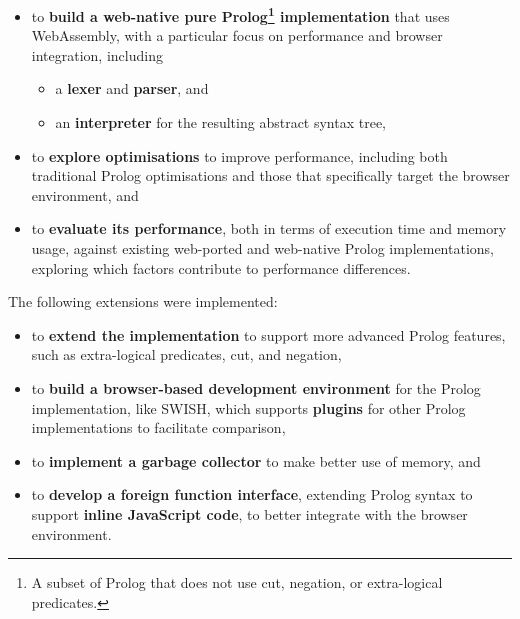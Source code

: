 \begin{itemize}
\item to \textbf{build a web-native pure Prolog\footnote{A subset of Prolog that does not use cut, negation, or extra-logical predicates.} implementation} that uses WebAssembly, with a particular focus on performance and browser integration, including
\begin{itemize}
\item a \textbf{lexer} and \textbf{parser}, and
\item an \textbf{interpreter} for the resulting abstract syntax tree,
\end{itemize}
\item to \textbf{explore optimisations} to improve performance, including both traditional Prolog optimisations and those that specifically target the browser environment, and
\item to \textbf{evaluate its performance}, both in terms of execution time and memory usage, against existing web-ported and web-native Prolog implementations, exploring which factors contribute to performance differences.
\end{itemize}

The following extensions were implemented:

\begin{itemize}
\item to \textbf{extend the implementation} to support more advanced Prolog features, such as extra-logical predicates, cut, and negation,
\item to \textbf{build a browser-based development environment} for the Prolog implementation, like SWISH, which supports \textbf{plugins} for other Prolog implementations to facilitate comparison,
\item to \textbf{implement a garbage collector} to make better use of memory, and
\item to \textbf{develop a foreign function interface}, extending Prolog syntax to support \textbf{inline JavaScript code}, to better integrate with the browser environment.
\end{itemize}